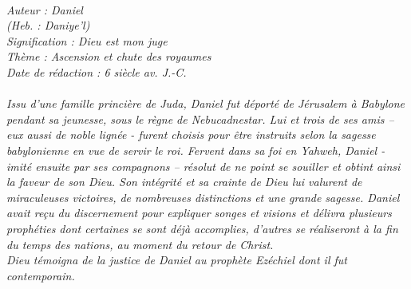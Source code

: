 \BFont
\noindent\hrulefill
{\footnotesize
\textit{
\bigskip
{\centering{}
\\Auteur : Daniel
\\(Heb. : Daniye'l)
\\Signification : Dieu est mon juge
\\Thème : Ascension et chute des royaumes
\\Date de rédaction : 6 siècle av. J.-C.\\}
}
\textit{
\\Issu d'une famille princière de Juda, Daniel fut déporté de Jérusalem à Babylone pendant sa jeunesse, sous le règne de Nebucadnestar. Lui et trois de ses amis – eux aussi de noble lignée - furent choisis pour être instruits selon la sagesse babylonienne en vue de servir le roi. Fervent dans sa foi en Yahweh, Daniel - imité ensuite par ses compagnons – résolut de ne point se souiller et obtint ainsi la faveur de son Dieu. Son intégrité et sa crainte de Dieu lui valurent de miraculeuses victoires, de nombreuses distinctions et une grande sagesse. Daniel avait reçu du discernement pour expliquer songes et visions et délivra plusieurs prophéties dont certaines se sont déjà accomplies, d'autres se réaliseront à la fin du temps des nations, au moment du retour de Christ.
\\Dieu témoigna de la justice de Daniel au prophète Ezéchiel dont il fut contemporain.\bigskip
}
}
\par\nobreak\noindent\hrulefill
